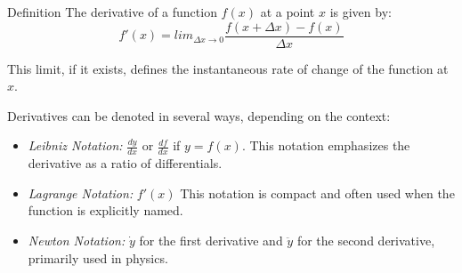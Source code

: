 \begin{mybox}{Definition}
	The derivative of a function $f(x)$ at a point $x$ is given by:
	\[
	f'(x) = lim_{\Delta x \to 0} \frac{f(x+\Delta x) - f(x)}{\Delta x}
	\]

	This limit, if it exists, defines the instantaneous rate of change of the function at $x$.
\end{mybox}

Derivatives can be denoted in several ways, depending on the context:

\begin{itemize}
	\item \emph{Leibniz Notation:} $\frac{dy}{dx}$ or $\frac{df}{dx}$ if $y=f(x)$. This notation emphasizes the derivative as a ratio of differentials.
	\item \emph{Lagrange Notation:} $f'(x)$ This notation is compact and often used when the function is explicitly named.
	\item \emph{Newton Notation:} $\dot y$ for the first derivative and $\ddot y$ for the second derivative, primarily used in physics.
\end{itemize}

%

